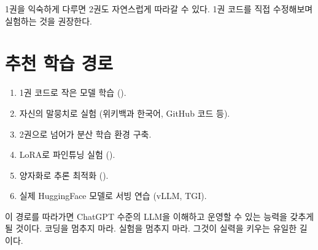1권을 익숙하게 다루면 2권도 자연스럽게 따라갈 수 있다. 1권 코드를 직접 수정해보며 실험하는 것을 권장한다.

\section{추천 학습 경로}

\begin{enumerate}
  \item 1권 코드로 작은 모델 학습 ().
  \item 자신의 말뭉치로 실험 (위키백과 한국어, GitHub 코드 등).
  \item 2권으로 넘어가 분산 학습 환경 구축.
  \item LoRA로 파인튜닝 실험 ().
  \item 양자화로 추론 최적화 ().
  \item 실제 HuggingFace 모델로 서빙 연습 (vLLM, TGI).
\end{enumerate}

이 경로를 따라가면 ChatGPT 수준의 LLM을 이해하고 운영할 수 있는 능력을 갖추게 될 것이다. 코딩을 멈추지 마라. 실험을 멈추지 마라. 그것이 실력을 키우는 유일한 길이다.
